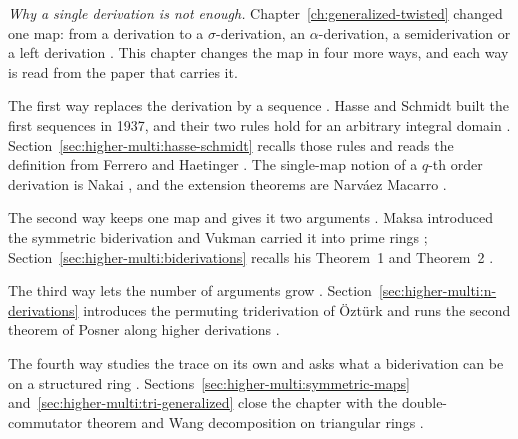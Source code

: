\emph{Why a single derivation is not enough.} Chapter~\ref{ch:generalized-twisted}
changed one map: from a derivation to a $\sigma$-derivation, an
$\alpha$-derivation, a semiderivation or a left derivation
\cite[p.~2841]{Chuang2017Auto}. This chapter changes the map in four more
ways, and each way is read from the paper that carries it.


The first way replaces the derivation by a sequence
\cite[p.~2323]{FerreroHaetinger2002}. Hasse and Schmidt built the first
sequences in 1937, and their two rules hold for an arbitrary integral domain
\cite[p.~224]{HasseSchmidt1937}. Section~\ref{sec:higher-multi:hasse-schmidt}
recalls those rules and reads the definition from Ferrero and Haetinger
\cite[p.~2323]{FerreroHaetinger2002}. The single-map notion of a $q$-th order
derivation is Nakai \cite[p.~1]{Nakai1970}, and the extension theorems are
Narv\'aez Macarro \cite[pp.~2983--2984]{NarvaezMacarro2009}.

The second way keeps one map and gives it two arguments
\cite[p.~245]{Vukman1989Bid}. Maksa introduced the symmetric biderivation
\cite[references~5 and~6]{Vukman1989Bid} and Vukman carried it into prime
rings \cite[p.~245]{Vukman1989Bid}; Section~\ref{sec:higher-multi:biderivations}
recalls his Theorem~1 and Theorem~2 \cite[pp.~246, 249]{Vukman1989Bid}.

The third way lets the number of arguments grow
\cite[p.~490]{Yazarli2017Trideriv}. Section~\ref{sec:higher-multi:n-derivations}
introduces the permuting triderivation of Öztürk
\cite[reference~10]{Ozturk1999Trideriv} and runs the second theorem of Posner
along higher derivations \cite[p.~9]{Prajapati2021}.

The fourth way studies the trace on its own
\cite[p.~181]{Vukman1990Two} and asks what a biderivation can be on a
structured ring \cite[p.~1952]{Wang2016Bideriv}.
Sections~\ref{sec:higher-multi:symmetric-maps}
and~\ref{sec:higher-multi:tri-generalized} close the chapter with the
double-commutator theorem \cite[p.~187]{Vukman1990Two} and Wang
decomposition on triangular rings \cite[p.~1955]{Wang2016Bideriv}.

